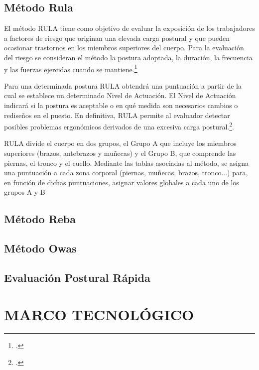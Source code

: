 \subsection{Método Rula}
El método RULA tiene como objetivo de evaluar la exposición de los trabajadores a factores de riesgo que originan una elevada carga postural y que pueden ocasionar trastornos en los miembros superiores del cuerpo. Para la evaluación del riesgo se consideran el método la postura adoptada, la duración, la frecuencia y las fuerzas ejercidas cuando se mantiene.\footcite[2]{McatamneyRULA:Disorders}

Para una determinada postura RULA obtendrá una puntuación a partir de la cual se establece un determinado Nivel de Actuación. El Nivel de Actuación indicará si la postura es aceptable o en qué medida son necesarios cambios o rediseños en el puesto. En definitiva, RULA permite al evaluador detectar posibles problemas ergonómicos derivados de una excesiva carga postural.\footcite{Diego-Mas2015EvaluacionRULA}.

RULA divide el cuerpo en dos grupos, el Grupo A que incluye los miembros superiores (brazos, antebrazos y muñecas) y el Grupo B, que comprende las piernas, el tronco y el cuello. Mediante las tablas asociadas al método, se asigna una puntuación a cada zona corporal (piernas, muñecas, brazos, tronco...) para, en función de dichas puntuaciones, asignar valores globales a cada uno de los grupos A y B
\subsection{Método Reba}
\subsection{Método Owas}
\subsection{Evaluación Postural Rápida}
\subsubsection{}
\section{MARCO TECNOLÓGICO}